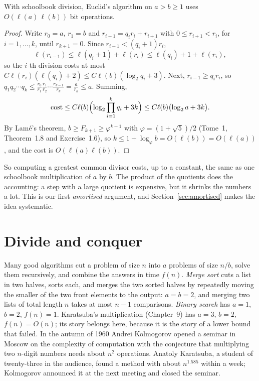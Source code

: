\begin{proposition}\label{prop:euclidbits}
With schoolbook division, Euclid's algorithm on $a>b\ge1$ uses $O(\ell(a)\,\ell(b))$ bit operations.
\end{proposition}
\begin{proof}
Write $r_0=a$, $r_1=b$ and $r_{i-1}=q_ir_i+r_{i+1}$ with $0\le r_{i+1}<r_i$, for $i=1,\dots,k$, until $r_{k+1}=0$. Since $r_{i-1}<(q_i+1)r_i$,
\[
\ell(r_{i-1})\le\ell(q_i+1)+\ell(r_i)\le\ell(q_i)+1+\ell(r_i),
\]
so the $i$-th division costs at most $C\ell(r_i)(\ell(q_i)+2)\le C\ell(b)(\log_2q_i+3)$. Next, $r_{i-1}\ge q_ir_i$, so
$q_1q_2\cdots q_k\le\frac{r_0}{r_1}\frac{r_1}{r_2}\cdots\frac{r_{k-1}}{r_k}=\frac{a}{r_k}\le a$. Summing,
\[
\text{cost}\le C\ell(b)\Bigl(\log_2\prod_{i=1}^kq_i+3k\Bigr)\le C\ell(b)\bigl(\log_2a+3k\bigr).
\]
By Lam\'e's theorem, $b\ge F_{k+1}\ge\varphi^{k-1}$ with $\varphi=(1+\sqrt5)/2$ (Tome~1, Theorem~1.8 and Exercise~1.6), so
$k\le1+\log_\varphi b=O(\ell(b))=O(\ell(a))$, and the cost is $O(\ell(a)\ell(b))$.
\end{proof}

So computing a greatest common divisor costs, up to a constant, the same as one schoolbook multiplication of $a$ by $b$. The
product of the quotients does the accounting: a step with a large quotient is expensive, but it shrinks the numbers a lot.
This is our first \emph{amortised} argument, and Section~\ref{sec:amortised} makes the idea systematic.

\section{Divide and conquer}\label{sec:master}

Many good algorithms cut a problem of size $n$ into $a$ problems of size $n/b$, solve them recursively, and combine the answers in time
$f(n)$. \emph{Merge sort} cuts a list in two halves, sorts each, and merges the two sorted halves by repeatedly moving the smaller of the
two front elements to the output: $a=b=2$, and merging two lists of total length $n$ takes at most $n-1$ comparisons. \emph{Binary
search} has $a=1$, $b=2$, $f(n)=1$. Karatsuba's multiplication (Chapter~9) has $a=3$, $b=2$, $f(n)=O(n)$; its story belongs here,
because it is the story of a lower bound that failed. In the autumn of 1960 Andrei Kolmogorov opened a seminar in Moscow on the complexity of
computation with the conjecture that multiplying two $n$-digit numbers needs about $n^2$ operations. Anatoly Karatsuba, a student of
twenty-three in the audience, found a method with about $n^{1.585}$ within a week; Kolmogorov announced it at the next meeting and closed
the seminar.

